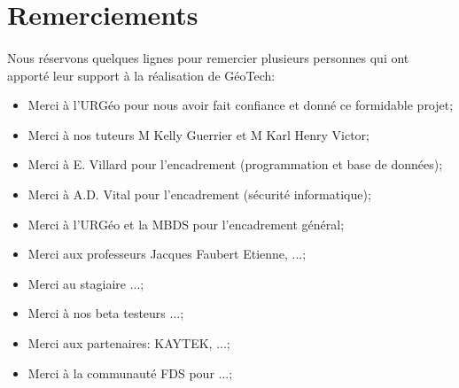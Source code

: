 \section{Remerciements}
\paragraph{}
Nous réservons quelques lignes pour remercier plusieurs personnes qui ont apporté leur support à la réalisation de GéoTech:\par



\begin{itemize}
    \item Merci à l'URGéo pour nous avoir fait confiance et donné ce formidable projet;\par
    \item Merci à nos tuteurs M Kelly Guerrier et M Karl Henry Victor;\par
    \item Merci à  E. Villard pour l'encadrement (programmation et base de données);\par
    \item Merci à A.D. Vital pour l'encadrement (sécurité informatique);\par
    \item Merci à l'URGéo et la MBDS pour l'encadrement général;\par
    \item Merci aux professeurs Jacques Faubert Etienne, ...;\par
    \item Merci au stagiaire ...;\par
    \item Merci à nos beta testeurs ...;\par
    \item Merci aux partenaires: KAYTEK, ...;\par
    \item Merci à la communauté FDS pour ...;\par
\end{itemize}
